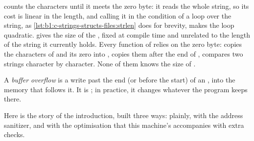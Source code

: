 \label{lst:b1:c-strings-structs-files:strlen}


 counts the characters until it meets the zero byte: it reads the whole string, so its cost is linear in
the length, and calling it in the condition of a loop over the string, as \cref{lst:b1:c-strings-structs-files:strlen}
does for brevity, makes the loop quadratic.  gives the size of the , fixed at compile time and
unrelated to the length of the string it currently holds. Every function of  relies on the zero byte:
 copies the characters of  and its zero into , 
copies them after the end of ,  compares two strings character by character. None of them knows
the size of .

\begin{definition}\label{def:b1:c-strings-structs-files:buffer-overflow}
A \emph{buffer overflow} is a write past the end (or before the start) of an , into the
memory that follows it. It is ; in practice, it changes whatever the program keeps there.
\end{definition}

Here is the story of the introduction, built three ways: plainly, with the address sanitizer, and with the
optimisation that this machine's  accompanies with extra checks.

\label{lst:b1:c-strings-structs-files:overflow}

\label{out:b1:c-strings-structs-files:overflow}

